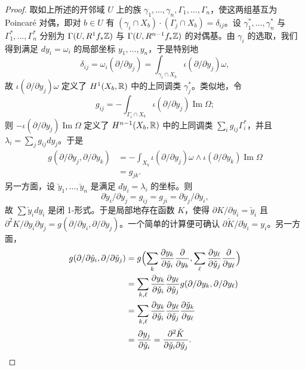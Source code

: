 \begin{proof}
取如上所述的开邻域 $U$ 上的族 $\gamma_1,\dots,\gamma_n,\Gamma_1,\dots,\Gamma_n$，使这两组基互为 Poincaré 对偶，即对 $b\in U$ 有 $(\gamma_i\cap X_b)\cdot(\Gamma_j\cap X_b)=\delta_{ij}$。设 $\gamma_1^*,\dots,\gamma_n^*$ 与 $\Gamma_1^*,\dots,\Gamma_n^*$ 分别为 $\Gamma(U,R^1f_*\mathbb{Z})$ 与 $\Gamma(U,R^{n-1}f_*\mathbb{Z})$ 的对偶基。由 $\gamma_i$ 的选取，我们得到满足 $dy_i=\omega_i$ 的局部坐标 $y_1,\dots,y_n$，于是特别地
\[
\delta_{ij}=\omega_i(\partial/\partial y_j)=\int_{\gamma_i\cap X_b}\iota(\partial/\partial y_j)\omega,
\]
故 $\iota(\partial/\partial y_j)\omega$ 定义了 $H^1(X_b,\mathbb{R})$ 中的上同调类 $\gamma_j^*$。类似地，令
\[
g_{ij}=-\int_{\Gamma_i\cap X_b}\iota(\partial/\partial y_j)\operatorname{Im}\Omega;
\]
则 $-\iota(\partial/\partial y_j)\operatorname{Im}\Omega$ 定义了 $H^{n-1}(X_b,\mathbb{R})$ 中的上同调类 $\sum_i g_{ij}\Gamma_i^*$，并且 $\lambda_i=\sum_j g_{ij}dy_j$。于是
\begin{align*}
g(\partial/\partial y_j,\partial/\partial y_k)&=-\int_{X_b}\iota(\partial/\partial y_j)\omega\wedge\iota(\partial/\partial y_k)\operatorname{Im}\Omega\\
&=g_{jk}.
\end{align*}
另一方面，设 $\check y_1,\dots,\check y_n$ 是满足 $d\check y_i=\lambda_i$ 的坐标。则
\[
\partial\check y_i/\partial y_j=g_{ij}=g_{ji}=\partial\check y_j/\partial y_i,
\]
故 $\sum \check y_idy_i$ 是闭 1-形式。于是局部地存在函数 $K$，使得 $\partial K/\partial y_i=\check y_i$ 且 $\partial^2K/\partial y_i\partial y_j=g(\partial/\partial y_i,\partial/\partial y_j)$。一个简单的计算便可确认 $\partial\check K/\partial\check y_i=y_i$。另一方面，
\begin{align*}
g(\partial/\partial\check y_i,\partial/\partial\check y_j)&=g\Bigl(\sum_k\frac{\partial y_k}{\partial\check y_i}\frac{\partial}{\partial y_k},\sum_\ell\frac{\partial y_\ell}{\partial\check y_j}\frac{\partial}{\partial y_\ell}\Bigr)\\
&=\sum_{k,\ell}\frac{\partial y_k}{\partial\check y_i}\frac{\partial y_\ell}{\partial\check y_j}g(\partial/\partial y_k,\partial/\partial y_\ell)\\
&=\sum_{k,\ell}\frac{\partial y_k}{\partial\check y_i}\frac{\partial y_\ell}{\partial\check y_j}\frac{\partial\check y_k}{\partial y_\ell}\\
&=\frac{\partial y_j}{\partial\check y_i}=\frac{\partial^2\check K}{\partial\check y_i\partial\check y_j}.
\end{align*}
\proofend
\end{proof}

